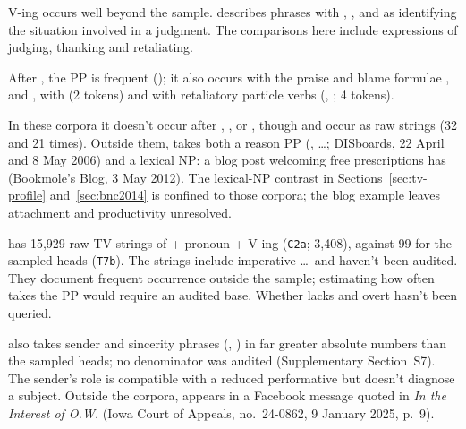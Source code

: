 \documentclass[12pt]{article}
\begin{document}
 V-ing occurs well beyond the sample. \textcite[101--103]{fillmore1969judging} describes  phrases with , ,  and  as identifying the situation involved in a judgment. The comparisons here include expressions of judging, thanking and retaliating.

After , the PP is frequent (); it also occurs with the praise and blame formulae ,  and , with  (2 tokens) and with retaliatory particle verbs (, ; 4 tokens).

In these corpora it doesn't occur after , ,  or , though  and  occur as raw strings (32 and 21 times). Outside them,  takes both a reason PP (, \dots; DISboards, 22 April and 8 May 2006) and a lexical NP: a blog post welcoming free prescriptions has  (Bookmole's Blog, 3 May 2012). The lexical-NP contrast in Sections~\ref{sec:tv-profile} and~\ref{sec:bnc2014} is confined to those corpora; the blog example leaves attachment and productivity unresolved.

 has 15,929 raw TV strings of  + pronoun +  V-ing (\texttt{C2a};  3,408), against 99 for the sampled heads (\texttt{T7b}). The  strings include imperative \dots\ and haven't been audited. They document frequent occurrence outside the sample; estimating how often  takes the PP would require an audited base. Whether  lacks  and overt  hasn't been queried.

 also takes sender and sincerity  phrases (, ) in far greater absolute numbers than the sampled heads; no denominator was audited (Supplementary Section~S7). The sender's role is compatible with a reduced performative but doesn't diagnose a subject. Outside the corpora,  appears in a Facebook message quoted in \emph{In the Interest of O.W.} (Iowa Court of Appeals, no.~24-0862, 9 January 2025, p.~9).
\end{document}
